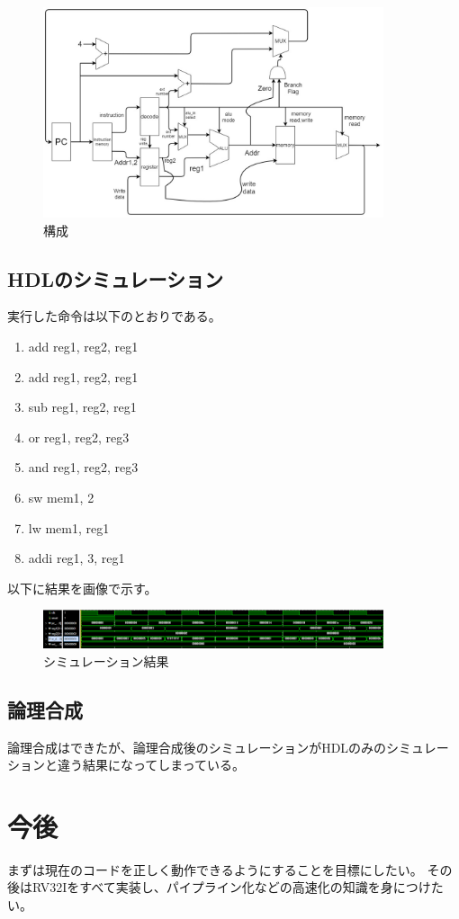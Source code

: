\documentclass[a4j,10pt]{jsarticle}
\begin{document}
\begin{figure}[htbp]
    \begin{center}
        \includegraphics[width=10cm]{./com.jpg}
        \caption{構成}
        \label{sample}
    \end{center}
\end{figure}
 
\subsection{HDLのシミュレーション}
実行した命令は以下のとおりである。

\begin{enumerate}
\item add reg1, reg2, reg1 
\item add reg1, reg2, reg1
\item sub reg1, reg2, reg1  
\item or reg1, reg2, reg3 
\item and reg1, reg2, reg3
\item sw mem1, 2
\item lw mem1, reg1
\item addi reg1, 3, reg1
\end{enumerate}

以下に結果を画像で示す。
\begin{figure}[htbp]
    \begin{center}
        \includegraphics[width=10cm]{./simu.png}
        \caption{シミュレーション結果}
        \label{simu}
    \end{center}
\end{figure}

\subsection{論理合成}
論理合成はできたが、論理合成後のシミュレーションがHDLのみのシミュレーションと違う結果になってしまっている。

\section{今後}
まずは現在のコードを正しく動作できるようにすることを目標にしたい。
その後はRV32Iをすべて実装し、パイプライン化などの高速化の知識を身につけたい。
\end{document}
